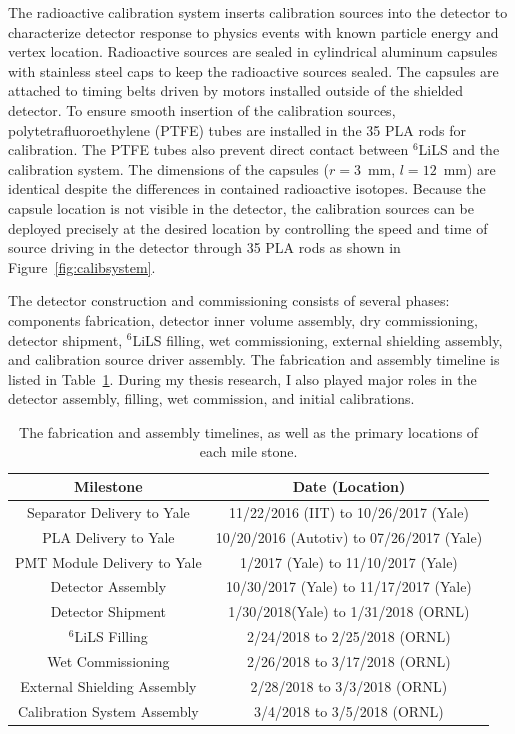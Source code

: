 The radioactive calibration system inserts calibration sources into the detector to characterize detector response to physics events with known particle energy and vertex location.
Radioactive sources are sealed in cylindrical aluminum capsules with stainless steel caps to keep the radioactive sources sealed.
The capsules are attached to timing belts driven by motors installed outside of the shielded detector. 
To ensure smooth insertion of the calibration sources, polytetrafluoroethylene (PTFE) tubes are installed in the 35 PLA rods for calibration. 
The PTFE tubes also prevent direct contact between $^6$LiLS and the calibration system.
The dimensions of the capsules ($r = 3$~mm, $l = 12$~mm) are identical despite the differences in contained radioactive isotopes.
Because the capsule location is not visible in the detector, the calibration sources can be deployed precisely at the desired location by controlling the speed and time of source driving in the detector through 35 PLA rods as shown in Figure~\ref{fig:calibsystem}.

\label{sec:ad_construct}

The detector construction and commissioning consists of several phases: components fabrication, detector inner volume assembly, dry commissioning, detector shipment, $^6$LiLS filling, wet commissioning, external shielding assembly, and calibration source driver assembly.
The fabrication and assembly timeline is listed in Table~\ref{tab:timeline}.
During my thesis research, I also played major roles in the detector assembly, filling, wet commission, and initial calibrations.

\begin{table}[htpb]
\centering
\label{tab:timeline}
\caption[Detector assembly time line]{The fabrication and assembly timelines, as well as the primary locations of each mile stone.}
\begin{tabular}{cc}
\hline
Milestone & Date (Location) \\
\hline
Separator Delivery to Yale & 11/22/2016 (IIT) to 10/26/2017 (Yale) \\ 
PLA Delivery to Yale &  10/20/2016 (Autotiv) to 07/26/2017 (Yale) \\
PMT Module Delivery to Yale  & 1/2017 (Yale) to 11/10/2017 (Yale)\\
\hline
Detector Assembly & 10/30/2017 (Yale) to 11/17/2017 (Yale)\\
Detector Shipment  & 1/30/2018(Yale) to 1/31/2018 (ORNL) \\ 
$^6$LiLS Filling &2/24/2018 to 2/25/2018  (ORNL)\\
Wet Commissioning & 2/26/2018 to 3/17/2018 (ORNL) \\
External Shielding Assembly & 2/28/2018 to 3/3/2018 (ORNL)\\
Calibration System Assembly & 3/4/2018 to 3/5/2018 (ORNL)\\
\hline
\end{tabular}
\end{table}

